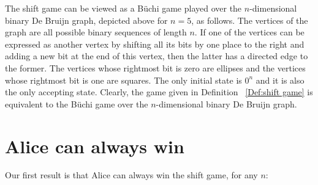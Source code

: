 \documentclass[final,12pt]{elsarticle}
\theoremstyle{definition} \newtheorem{definition}[theorem]{Definition} \newtheorem{observation}[theorem]{Observation} \newtheorem{example}[theorem]{Example} \newtheorem{remark}[theorem]{Remark} \newtheorem{corrolary}[theorem]{Corrolary}
\begin{document}
The shift game can be viewed as a B\"uchi game played over the $n$-dimensional binary De Bruijn graph, depicted above for $n=5$, as follows. The vertices of the graph are all possible binary sequences of length $n$. If one of the vertices can be expressed as another vertex by shifting all its bits by one place to the right and adding a new bit at the end of this vertex, then the latter has a directed edge to the former. The vertices whose rightmost bit is zero are ellipses and the vertices whose rightmost bit is one are squares. The only initial state is $0^n$ and it is also the only accepting state. Clearly, the game given in Definition~   \ref{Def:shift game} is equivalent to the B\"uchi game over the $n$-dimensional binary De Bruijn graph.

\section{Alice can always win} 
\label{sec:alice-wins}
Our first result is that Alice can always win the shift game, for any $n$:
\end{document}
